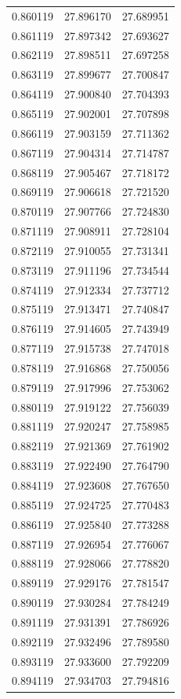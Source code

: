 \begin{tabular}{rrr}
0.860119 & 27.896170 & 27.689951 \\
0.861119 & 27.897342 & 27.693627 \\
0.862119 & 27.898511 & 27.697258 \\
0.863119 & 27.899677 & 27.700847 \\
0.864119 & 27.900840 & 27.704393 \\
0.865119 & 27.902001 & 27.707898 \\
0.866119 & 27.903159 & 27.711362 \\
0.867119 & 27.904314 & 27.714787 \\
0.868119 & 27.905467 & 27.718172 \\
0.869119 & 27.906618 & 27.721520 \\
0.870119 & 27.907766 & 27.724830 \\
0.871119 & 27.908911 & 27.728104 \\
0.872119 & 27.910055 & 27.731341 \\
0.873119 & 27.911196 & 27.734544 \\
0.874119 & 27.912334 & 27.737712 \\
0.875119 & 27.913471 & 27.740847 \\
0.876119 & 27.914605 & 27.743949 \\
0.877119 & 27.915738 & 27.747018 \\
0.878119 & 27.916868 & 27.750056 \\
0.879119 & 27.917996 & 27.753062 \\
0.880119 & 27.919122 & 27.756039 \\
0.881119 & 27.920247 & 27.758985 \\
0.882119 & 27.921369 & 27.761902 \\
0.883119 & 27.922490 & 27.764790 \\
0.884119 & 27.923608 & 27.767650 \\
0.885119 & 27.924725 & 27.770483 \\
0.886119 & 27.925840 & 27.773288 \\
0.887119 & 27.926954 & 27.776067 \\
0.888119 & 27.928066 & 27.778820 \\
0.889119 & 27.929176 & 27.781547 \\
0.890119 & 27.930284 & 27.784249 \\
0.891119 & 27.931391 & 27.786926 \\
0.892119 & 27.932496 & 27.789580 \\
0.893119 & 27.933600 & 27.792209 \\
0.894119 & 27.934703 & 27.794816 \\

\end{tabular}
